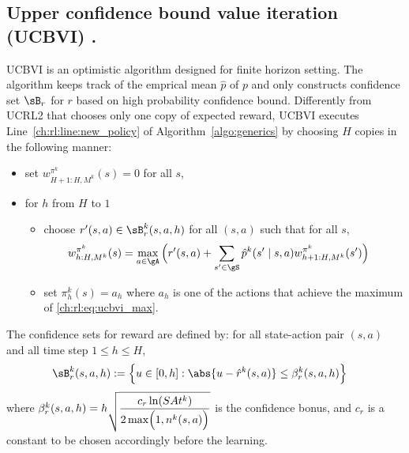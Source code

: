 \subsection{Upper confidence bound value iteration (UCBVI) \texorpdfstring{\cite{azar2017minimax}}{[AOM17]}.}
UCBVI is an optimistic algorithm designed for finite horizon setting.
The algorithm keeps track of the emprical mean $\hat{p}$ of $p$ and only constructs confidence set $\sB_r$ for $r$ based on high probability confidence bound.
Differently from UCRL2 that chooses only one copy of expected reward, UCBVI executes Line~\ref{ch:rl:line:new_policy} of Algorithm~\ref{algo:generics} by choosing $H$ copies in the following manner:
\begin{itemize}
    \item set $w^{\pi^k}_{H+1:H,M^k}(s)=0$ for all $s$,
    \item for $h$ from $H$ to $1$
        \begin{itemize}
            \item choose $r'(s,a)\in\sB^k_r(s,a,h)$ for all $(s,a)$ such that for all $s$,
            \begin{align}
                w^{\pi^k}_{h:H,M^k}(s) &=\max_{a\in\gA}\Big(r'(s,a)+\sum_{s'\in\gS}\hat{p}^k(s'\mid s,a)w_{h+1:H,M^k}^{\pi^k}(s')\Big) \label{ch:rl:eq:ucbvi_max}
            \end{align}
            \item set $\pi^k_h(s)=a_h$ where $a_h$ is one of the actions that achieve the maximum of \eqref{ch:rl:eq:ucbvi_max}.
        \end{itemize}
\end{itemize}
The confidence sets for reward are defined by: for all state-action pair $(s,a)$ and all time step $1\le h\le H$,
\begin{align*}
    \sB_r^k(s,a,h)&:=\Bigl\{u\in[0,h] : \abs{u-\hat{r}^k(s,a)}\le\beta^k_r(s,a,h)\Bigr\}
\end{align*}
where $\beta_r^k(s,a,h)=\displaystyle h\sqrt{\frac{c_r\ln(SAt^k)}{2\max\Bigl(1,n^k(s,a)\Bigr)}}$ is the confidence bonus, and $c_r$ is a constant to be chosen accordingly before the learning.

